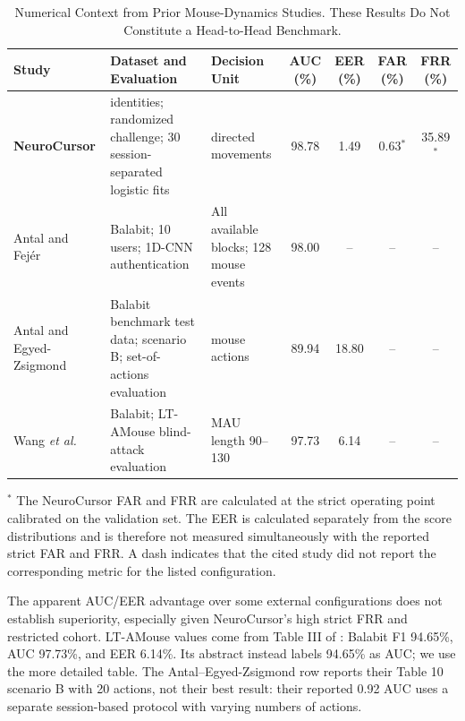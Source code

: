 \documentclass[conference]{IEEEtran}
\begin{document}
\begin{table}[t]
\centering
\small
\caption{Numerical Context from Prior Mouse-Dynamics Studies. These Results
Do Not Constitute a Head-to-Head Benchmark.}
\label{tab:prior_work_comparison}
\begin{tabular}{@{}>{\raggedright\arraybackslash}p{2.4cm}
                    >{\raggedright\arraybackslash}p{4.8cm}
                    >{\raggedright\arraybackslash}p{2.5cm}
                    cccc@{}}
\toprule
\textbf{Study} &
\textbf{Dataset and Evaluation} &
\textbf{Decision Unit} &
\textbf{AUC (\%)} &
\textbf{EER (\%)} &
\textbf{FAR (\%)} &
\textbf{FRR (\%)} \\
\midrule
\textbf{NeuroCursor} &
10 identities; randomized challenge; 30 session-separated logistic fits &
5 directed movements &
98.78 &
1.49 &
0.63$^{*}$ &
35.89$^{*}$ \\

Antal and Fej\'er \cite{antalFejer2020} &
Balabit; 10 users; 1D-CNN authentication &
All available blocks; 128 mouse events &
98.00 &
-- &
-- &
-- \\

Antal and Egyed-Zsigmond \cite{antalEgyed2019} &
Balabit benchmark test data; scenario B; set-of-actions evaluation &
20 mouse actions &
89.94 &
18.80 &
-- &
-- \\

Wang \textit{et al.} \cite{wang2025Mouse} &
Balabit; LT-AMouse blind-attack evaluation &
MAU length 90--130 &
97.73 &
6.14 &
-- &
-- \\
\bottomrule
\end{tabular}

\vspace{1mm}
\begin{minipage}{0.97\textwidth}
\footnotesize

$^{*}$ The NeuroCursor FAR and FRR are calculated at the strict operating point calibrated on the validation set. The EER is calculated separately from the score distributions and is therefore not measured simultaneously with the reported strict FAR and FRR. A dash indicates that the cited study did not report the corresponding metric for the listed configuration.
\end{minipage}
\end{table}

The apparent AUC/EER advantage over some external configurations does not
establish superiority, especially given NeuroCursor's high strict FRR and
restricted cohort. LT-AMouse values come from Table III of
\cite{wang2025Mouse}: Balabit F1 94.65\%, AUC 97.73\%, and EER 6.14\%.
Its abstract instead labels 94.65\% as AUC; we use the more detailed table.
The Antal--Egyed-Zsigmond row reports their Table 10 scenario B with 20
actions, not their best result: their reported 0.92 AUC uses a separate
session-based protocol with varying numbers of actions.
\end{document}
